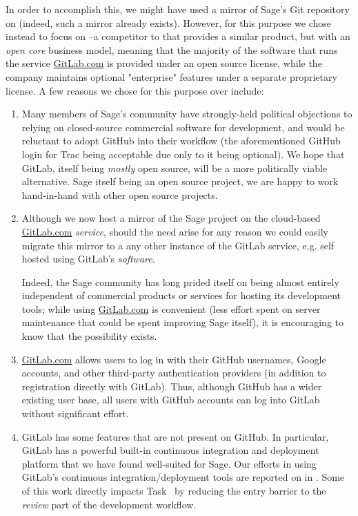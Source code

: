 In order to accomplish this, we might have used a mirror of Sage's Git
repository on \GitHub (indeed, such a mirror already exists).  However, for
this purpose we chose instead to focus on \GitLab--a competitor to \GitHub that
provides a similar product, but with an {\em open core} business model, meaning
that the majority of the software that runs the service \url{GitLab.com} is
provided under an open source license, while the company maintains optional
"enterprise" features under a separate proprietary license.  A few reasons we
chose \GitLab for this purpose over \GitHub include:

\begin{enumerate}
\item Many members of Sage's community have strongly-held political objections
    to relying on closed-source commercial software for development, and would
    be reluctant to adopt GitHub into their workflow (the aforementioned GitHub
    login for Trac being acceptable due only to it being optional).  We hope
    that GitLab, itself being {\em mostly} open source, will be a more
    politically viable alternative. Sage itself being an open source project,
    we are happy to work hand-in-hand with other open source projects.

  \item Although we now host a mirror of the Sage project on
    the cloud-based \url{GitLab.com} {\em service}, should the need
    arise for any reason we could easily migrate this mirror to a
    any other instance of the GitLab service, e.g. self hosted using
    GitLab's {\em software}.

    Indeed, the Sage community has long prided itself on being almost entirely
    independent of commercial products or services for hosting its
    development tools; while using \url{GitLab.com} is convenient (less
    effort spent on server maintenance that could be spent improving Sage
    itself), it is encouraging to know that the possibility exists.

\item \url{GitLab.com} allows users to log in with their GitHub usernames, Google
    accounts, and other third-party authentication providers (in addition to
    registration directly with GitLab).  Thus, although GitHub has a wider
    existing user base, all users with GitHub accounts can log into GitLab
    without significant effort.

\item GitLab has some features that are not present on GitHub.  In particular,
    GitLab has a powerful built-in continuous integration and deployment
    platform that we have found well-suited for Sage.  Our efforts in using
    GitLab's continuous integration/deployment tools are reported on in
    .  Some of
    this work directly impacts
    Task~ by reducing the entry
    barrier to the {\em review} part of the development workflow.


\end{enumerate}
